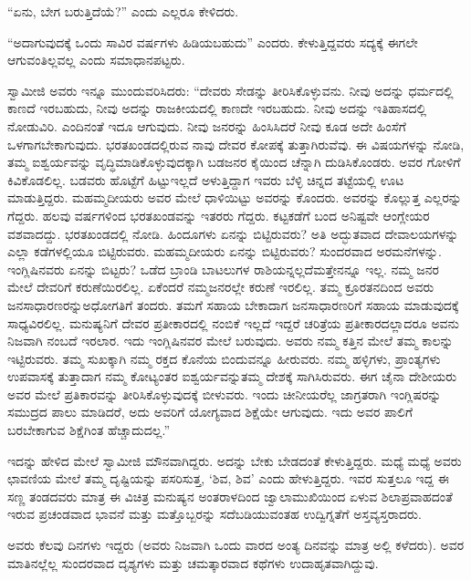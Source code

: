 “ಏನು, ಬೇಗ ಬರುತ್ತಿದೆಯೆ?” ಎಂದು ಎಲ್ಲರೂ ಕೇಳಿದರು.

“ಅದಾಗುವುದಕ್ಕೆ ಒಂದು ಸಾವಿರ ವರ್ಷಗಳು ಹಿಡಿಯಬಹುದು” ಎಂದರು. ಕೇಳುತ್ತಿದ್ದವರು ಸದ್ಯಕ್ಕೆ ಈಗಲೇ ಆಗುವಂತಿಲ್ಲವಲ್ಲ ಎಂದು ಸಮಾಧಾನಪಟ್ಟರು.

ಸ್ವಾಮೀಜಿ ಅವರು ಇನ್ನೂ ಮುಂದುವರಿಸಿದರು: “ದೇವರು ಸೇಡನ್ನು ತೀರಿಸಿಕೊಳ್ಳುವನು. ನೀವು ಅದನ್ನು ಧರ್ಮದಲ್ಲಿ ಕಾಣದೆ ಇರಬಹುದು, ನೀವು ಅದನ್ನು ರಾಜಕೀಯದಲ್ಲಿ ಕಾಣದೇ ಇರಬಹುದು. ನೀವು ಅದನ್ನು ಇತಿಹಾಸದಲ್ಲಿ ನೋಡುವಿರಿ. ಎಂದಿನಂತೆ ಇದೂ ಆಗುವುದು. ನೀವು ಜನರನ್ನು ಹಿಂಸಿಸಿದರೆ ನೀವು ಕೂಡ ಅದೇ ಹಿಂಸೆಗೆ ಒಳಗಾಗಬೇಕಾಗುವುದು. ಭರತಖಂಡದಲ್ಲಿರುವ ನಾವು ದೇವರ ಕೋಪಕ್ಕೆ ತುತ್ತಾಗಿರುವೆವು. ಈ ವಿಷಯಗಳನ್ನು ನೋಡಿ, ತಮ್ಮ ಐಶ್ವರ್ಯವನ್ನು ವೃದ್ಧಿಮಾಡಿಕೊಳ್ಳುವುದಕ್ಕಾಗಿ ಬಡಜನರ ಕೈಯಿಂದ ಚೆನ್ನಾಗಿ ದುಡಿಸಿಕೊಂಡರು. ಅವರ ಗೋಳಿಗೆ ಕಿವಿಕೊಡಲಿಲ್ಲ. ಬಡವರು ಹೊಟ್ಟೆಗೆ ಹಿಟ್ಟು\break ಇಲ್ಲದೆ ಅಳುತ್ತಿದ್ದಾಗ ಇವರು ಬೆಳ್ಳಿ ಚಿನ್ನದ ತಟ್ಟೆಯಲ್ಲಿ ಊಟ ಮಾಡುತ್ತಿದ್ದರು. ಮಹಮ್ಮದೀ\-ಯರು ಅವರ ಮೇಲೆ ಧಾಳಿಯಿಟ್ಟು ಅವರನ್ನು ಕೊಂದರು. ಅವರನ್ನು ಕೊಲ್ಲುತ್ತ ಎಲ್ಲರನ್ನು ಗೆದ್ದರು. ಹಲವು ವರ್ಷಗಳಿಂದ ಭರತಖಂಡವನ್ನು ಇತರರು ಗೆದ್ದರು. ಕಟ್ಟಕಡೆಗೆ ಬಂದ ಅನಿಷ್ಟವೇ ಆಂಗ್ಲೇಯರ ವಶವಾದದ್ದು. ಭರತಖಂಡದಲ್ಲಿ ನೋಡಿ. ಹಿಂದೂಗಳು ಏನನ್ನು ಬಿಟ್ಟಿರುವರು? ಅತಿ ಅದ್ಭುತವಾದ ದೇವಾಲಯಗಳನ್ನು ಎಲ್ಲಾ ಕಡೆಗಳಲ್ಲಿಯೂ ಬಿಟ್ಟಿರುವರು. ಮಹಮ್ಮದೀಯರು ಏನನ್ನು ಬಿಟ್ಟಿರುವರು? ಸುಂದರವಾದ ಅರಮನೆಗಳನ್ನು. ಇಂಗ್ಲಿಷಿನವರು ಏನನ್ನು ಬಿಟ್ಟರು? ಒಡೆದ ಬ್ರಾಂಡಿ ಬಾಟಲುಗಳ ರಾಶಿಯನ್ನಲ್ಲದೆ\break ಮತ್ತೇನನ್ನೂ ಇಲ್ಲ. ನಮ್ಮ ಜನರ ಮೇಲೆ ದೇವರಿಗೆ ಕರುಣೆಯಿರಲಿಲ್ಲ. ಏಕೆಂದರೆ ನಮ್ಮ\break ಜನರಲ್ಲೇ ಕರುಣೆ ಇರಲಿಲ್ಲ. ತಮ್ಮ ಕ್ರೂರತನದಿಂದ ಅವರು ಜನಸಾಧಾರಣರನ್ನು\break ಅಧೋಗತಿಗೆ ತಂದರು. ತಮಗೆ ಸಹಾಯ ಬೇಕಾದಾಗ ಜನಸಾಧಾರಣರಿಗೆ ಸಹಾಯ ಮಾಡುವುದಕ್ಕೆ ಸಾಧ್ಯವಿರಲಿಲ್ಲ. ಮನುಷ್ಯನಿಗೆ ದೇವರ ಪ್ರತೀಕಾರದಲ್ಲಿ ನಂಬಿಕೆ ಇಲ್ಲದೆ ಇದ್ದರೆ ಚರಿತ್ರೆಯ ಪ್ರತೀಕಾರದಲ್ಲಾದರೂ ಅವನು ನಿಜವಾಗಿ ನಂಬದೆ ಇರಲಾರ. ಇದು ಇಂಗ್ಲಿಷಿನವರ ಮೇಲೆ ಬರುವುದು. ಅವರು ನಮ್ಮ ಕತ್ತಿನ ಮೇಲೆ ತಮ್ಮ ಕಾಲನ್ನು ಇಟ್ಟಿರುವರು. ತಮ್ಮ ಸುಖಕ್ಕಾಗಿ ನಮ್ಮ ರಕ್ತದ ಕೊನೆಯ ಬಿಂದುವನ್ನೂ ಹೀರುವರು. ನಮ್ಮ ಹಳ್ಳಿಗಳು, ಪ್ರಾಂತ್ಯಗಳು ಉಪವಾಸಕ್ಕೆ ತುತ್ತಾದಾಗ ನಮ್ಮ ಕೋಟ್ಯಂತರ ಐಶ್ವರ್ಯವನ್ನು\break ತಮ್ಮ ದೇಶಕ್ಕೆ ಸಾಗಿಸಿರುವರು. ಈಗ ಚೈನಾ ದೇಶೀಯರು ಅವರ ಮೇಲೆ ಪ್ರತಿಕಾರವನ್ನು ತೀರಿಸಿಕೊಳ್ಳುವುದಕ್ಕೆ ಬೀಳುವರು. ಇಂದು ಚೀನೀಯರೆಲ್ಲ ಜಾಗ್ರತರಾಗಿ ಇಂಗ್ಲಿಷರನ್ನು ಸಮುದ್ರದ ಪಾಲು ಮಾಡಿದರೆ, ಅದು ಅವರಿಗೆ ಯೋಗ್ಯವಾದ ಶಿಕ್ಷೆಯೇ ಆಗುವುದು. ಇದು ಅವರ ಪಾಲಿಗೆ ಬರಬೇಕಾಗುವ ಶಿಕ್ಷೆಗಿಂತ ಹೆಚ್ಚಾದುದಲ್ಲ.”

ಇದನ್ನು ಹೇಳಿದ ಮೇಲೆ ಸ್ವಾಮೀಜಿ ಮೌನವಾಗಿದ್ದರು. ಅದನ್ನು ಬೇಕು ಬೇಡದಂತೆ ಕೇಳುತ್ತಿದ್ದರು. ಮಧ್ಯೆ ಮಧ್ಯೆ ಅವರು ಛಾವಣಿಯ ಮೇಲೆ ತಮ್ಮ ದೃಷ್ಟಿಯನ್ನು ಪಸರಿಸುತ್ತ, ‘ಶಿವ, ಶಿವ’ ಎಂದು ಹೇಳುತ್ತಿದ್ದರು. ಇವರ ಸುತ್ತಲೂ ಇದ್ದ ಈ ಸಣ್ಣ ತಂಡದವರು ಮಾತ್ರ ಈ ವಿಚಿತ್ರ ಮನುಷ್ಯನ ಅಂತರಾಳದಿಂದ ಜ್ವಾಲಾಮುಖಿಯಿಂದ ಏಳುವ ಶಿಲಾಪ್ರವಾಹದಂತೆ ಇರುವ ಪ್ರಚಂಡವಾದ ಭಾವನೆ ಮತ್ತು ಮತ್ತೊಬ್ಬರನ್ನು ಸದೆಬಡಿಯುವಂತಹ ಉದ್ವಿಗ್ನತೆಗೆ ಅಸ್ತವ್ಯಸ್ತರಾದರು.

ಅವರು ಕೆಲವು ದಿನಗಳು ಇದ್ದರು (ಅವರು ನಿಜವಾಗಿ ಒಂದು ವಾರದ ಅಂತ್ಯ ದಿನವನ್ನು ಮಾತ್ರ ಅಲ್ಲಿ ಕಳೆದರು). ಅವರ ಮಾತಿನಲ್ಲೆಲ್ಲ ಸುಂದರವಾದ ದೃಶ್ಯಗಳು ಮತ್ತು ಚಮತ್ಕಾರವಾದ ಕಥೆಗಳು ಉದಾಹೃತವಾಗಿದ್ದುವು.

